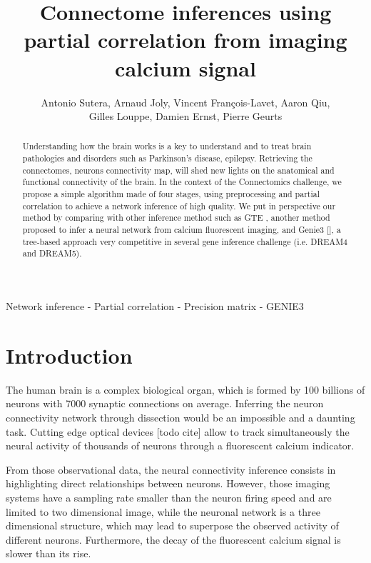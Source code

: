 \documentclass[wcp]{jmlr}
\title{Connectome inferences using partial correlation from imaging calcium signal}
\author{Antonio Sutera,
        Arnaud Joly,
        Vincent François-Lavet,
        Aaron Qiu, \\
        Gilles Louppe,
        Damien Ernst,
        Pierre Geurts}
\begin{document}
\maketitle


\begin{abstract} Understanding how the brain works is a key to understand and
to treat brain pathologies and disorders such as Parkinson's disease,
epilepsy. Retrieving the connectomes, neurons connectivity map, will shed new
lights on the anatomical and functional connectivity of the brain. In the
context of the Connectomics challenge, we propose a simple  algorithm made of
four stages, using preprocessing and partial correlation to achieve a network
inference of high quality. We put in perspective our method by comparing
with other inference method such as GTE \cite{stetter2012model}, another
method proposed to infer a neural network from calcium fluorescent imaging,
and Genie3 [], a tree-based approach very competitive in several gene
inference challenge (i.e. DREAM4 and DREAM5).


\end{abstract}

\begin{keywords}
Network inference - Partial correlation - Precision matrix - GENIE3
\end{keywords}


\section{Introduction}\label{sec:intro}

The human brain is a complex biological organ, which is formed by 100
billions of neurons with 7000 synaptic connections on average. Inferring the
neuron connectivity network through dissection would be an impossible
and a daunting task. Cutting edge optical devices [todo cite] allow to track
simultaneously the neural activity of thousands of neurons through a fluorescent
calcium indicator.

From those observational data, the neural connectivity inference consists in
highlighting direct relationships between neurons. However, those imaging
systems have a sampling rate smaller than the neuron firing speed and are
limited to two dimensional image, while the neuronal network is a
three dimensional structure, which may lead to superpose the observed activity
of different neurons. Furthermore, the decay of the fluorescent calcium signal
is slower than its rise.
\end{document}
